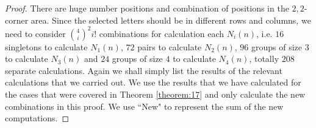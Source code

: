 \documentclass[
final,nomarks
]{dmtcs-episciences}
\newcommand{\tref}[1]{Theorem \ref{theorem:#1}}
\begin{document}
\begin{proof}
	There are huge number positions and combination of positions in the \begin{math}2,2\end{math}-corner area. Since the selected letters should be in different rows and columns, we need to consider \begin{math}\binom{4}{i}^2 i!\end{math} combinations for calculation each \begin{math}N_i(n)\end{math}, i.e. \begin{math}16\end{math} singletons to calculate \begin{math}N_1(n)\end{math}, \begin{math}72\end{math} pairs to calculate \begin{math}N_2(n)\end{math}, \begin{math}96\end{math} groups of size \begin{math}3\end{math} to calculate \begin{math}N_3(n)\end{math} and \begin{math}24\end{math} groups of size \begin{math}4\end{math} to calculate \begin{math}N_4(n)\end{math}, totally \begin{math}208\end{math} separate calculations. Again we shall simply list the results of the relevant calculations 
	that we carried out. 
	We use the results that we have calculated for the cases that were covered in \tref{17} and only calculate the new combinations in this proof. We use ``New" to represent the sum of the new computations.
	

\end{proof}
\end{document}
